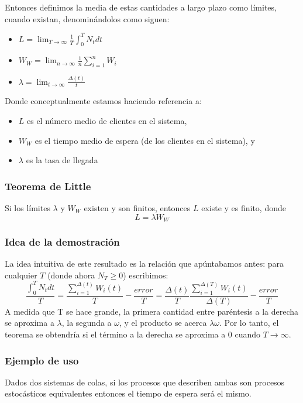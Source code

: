 \documentclass[8pt]{beamer}
\begin{document}
  \begin{frame}
  	Entonces definimos la media de estas cantidades a largo plazo como límites, cuando existan, denominándolos
  	como siguen:
  	
  	\begin{itemize}
  		\item $L = \lim_{T\to \infty}\frac{1}{T} \int_{0}^{T} N_t dt$
  		\item $W_W = \lim_{n\to \infty}\frac{1}{n} \sum_{i=1}^{n} W_i$
  		\item $\lambda = \lim_{t\to \infty}\frac{\Delta(t)}{t}$
  	\end{itemize}
  	
  	Donde conceptualmente estamos haciendo referencia a:
  	\begin{itemize}
  		\item $L$ es el número medio de clientes en el sistema,
  		\item $W_W$ es el tiempo medio de espera (de los clientes en el sistema), y
  		\item $\lambda$ es la tasa de llegada 
  	\end{itemize}
  \end{frame}
  
  \begin{frame}\frametitle{Teorema de Little}
    Si los límites $\lambda$ y $W_W$ existen y son finitos, entonces $L$ existe y es finito, donde 
    \[L = \lambda W_W\]
  \end{frame}
  \begin{frame}\frametitle{Idea de la demostración}
  	La idea intuitiva de este resultado es la relación que apúntabamos antes: para cualquier $T$ (donde ahora $N_T \geq 0$) escribimos:
  	\[ \frac{\int_{0}^{T} N_t dt}{T}=\frac{\sum_{i=1}^{\Delta (t)} W_i(t)}{T}-\frac{error}{T}=\frac{\Delta(t)}{T}\frac{\sum_{i=1}^{\Delta (T)} W_i(t)}{\Delta(T)}-\frac{error}{T}   \]
  	A medida que T se hace grande, la primera cantidad entre paréntesis a la derecha se aproxima a $\lambda$, la segunda a $\omega$, 
  	y el producto se acerca $\lambda\omega$. Por lo tanto, el teorema se obtendría si el término a la derecha 
  	se aproxima a 0 cuando $T\rightarrow\infty$. 
  \end{frame}
   \begin{frame}\frametitle{Ejemplo de uso}
   	Dados dos sistemas de colas, si los procesos que describen ambas son procesos estocásticos 
   	equivalentes entonces el tiempo de espera será el mismo. 
   \end{frame} 
  
\end{document}
